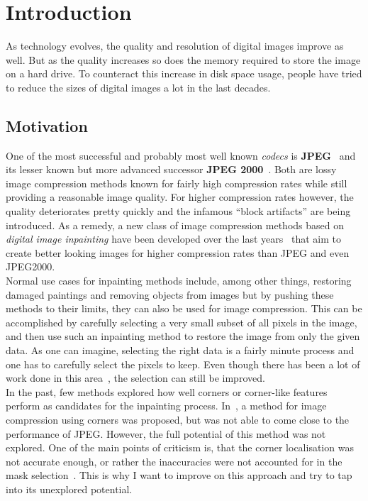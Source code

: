 \chapter{Introduction}\label{ch:Intro}
As technology evolves, the quality and resolution of digital images improve as well. But as the
quality increases so does the memory required to store the image on a hard drive. To counteract
this increase in disk space usage, people have tried to reduce the sizes of digital images a lot in the
last decades.

\section{Motivation}
One of the most successful and probably most well known \textit{codecs}
is \textbf{JPEG}~\cite{wallace91} and its lesser known but more advanced successor \textbf{JPEG
2000}~\cite{jpeg2000}. Both are lossy image compression methods
known for fairly high compression rates while still providing a reasonable image quality.
For higher compression rates however, the quality deteriorates pretty quickly and the infamous ``block
artifacts'' are being introduced. As a remedy, a new class of image compression methods based on
\textit{digital image inpainting} have been developed over the last
years~\cite{galic05, galic08, mainberger12, peloquin09, zimmer07, mainberger09, mainberger10, dong07, schmaltz09} that
aim to create better looking images for higher compression rates than JPEG and even JPEG2000. \\
Normal use cases for inpainting methods include, among other things, restoring damaged paintings and removing 
objects from images but by pushing these methods to their limits, they can also be used for image compression.
This can be accomplished by carefully selecting a very small subset of all pixels in the image, 
and then use such an inpainting method to restore the image from only the given data.
As one can imagine, selecting the right data is a fairly minute process and one has to carefully
select the pixels to keep. Even though there has been a lot of work done in this
area~\cite{belhachmi09, schmaltz14, hoeltgen12}, the
selection can still be improved.\\
In the past, few methods explored how well corners or corner-like features perform as candidates for
the inpainting process. In~\cite{zimmer07}, a method for image compression using corners was
proposed, but was not able to come close to the performance of JPEG\@.
However, the full potential of this method was not explored. \newpage\noindent
One of the main points of criticism is,
that the corner localisation was not accurate enough, or rather the inaccuracies were not accounted 
for in the mask selection~\cite{conversation}. This is why I want to improve on this approach and try 
to tap into its unexplored potential.

